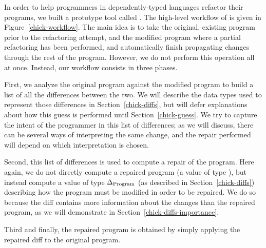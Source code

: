 In order to help programmers in dependently-typed languages refactor their
programs, we built a prototype tool called \Chick{}.  The high-level workflow of
\Chick{} is given in Figure~\ref{chick-workflow}.  The main idea is to take the
original, existing program prior to the refactoring attempt, and the modified
program where a partial refactoring has been performed, and automatically finish
propagating changes through the rest of the program.  However, we do not perform
this operation all at once.  Instead, our workflow consists in three phases.

First, we analyze the original program against the modified program to build a
list of all the differences between the two.  We will describe the data types
used to represent those differences in Section~\ref{chick-diffs}, but will defer
explanations about how this guess is performed until Section~\ref{chick-guess}.
We try to capture the intent of the programmer in this list of differences; as
we will discuss, there can be several ways of interpreting the same change, and
the repair performed will depend on which interpretation is chosen.

Second, this list of differences is used to compute a repair of the program.
Here again, we do not directly compute a repaired program (a value of type
), but instead compute a value of type $\Delta_{\normalfont \text{Program}}$ (as
described in Section~\ref{chick-diffs}) describing how the program must be
modified in order to be repaired.  We do so because the diff contains more
information about the changes than the repaired program, as we will demonstrate
in Section~\ref{chick-diffs-importance}.

Third and finally, the repaired program is obtained by simply applying the
repaired diff to the original program.

